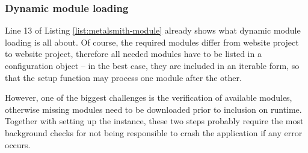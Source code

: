 \subsubsection{Dynamic module loading}
Line 13 of Listing \ref{list:metalsmith-module} already shows what dynamic module loading is all about. Of course, the required modules differ from website project to website project, therefore all needed modules have to be listed in a configuration object -- in the best case, they are included in an iterable form, so that the setup function may process one module after the other.

However, one of the biggest challenges is the verification of available modules, otherwise missing modules need to be downloaded prior to inclusion on runtime. Together with setting up the instance, these two steps probably require the most background checks for not being responsible to crash the application if any error occurs.
